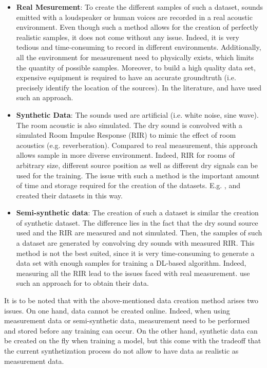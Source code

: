 \documentclass[11pt,a4paper,twoside]{report}
\begin{document}
\begin{itemize}
    \item \textbf{Real Mesurement}: To create the different samples of such a dataset, sounds emitted with a loudspeaker or human voices are recorded in a real acoustic environment. Even though such a method allows for the creation of perfectly realistic samples, it does not come without any issue. Indeed, it is very tedious and time-consuming to record in different environments. Additionally, all the environment for measurement need to physically exists, which limits the quantity of possible samples. Moreover, to build a high quality data set, expensive equipment is required to have an accurate groundtruth (i.e. precisely identify the location of the sources). In the literature, \cite{he2018deep} and \cite{ferguson2018sound} have used such an approach.
    \item \textbf{Synthetic Data}: The sounds used are artificial (i.e. white noise, sine wave). The room acoustic is also simulated. The dry sound is convolved with a simulated Room Impulse Response (RIR) to mimic the effect of room acoustics (e.g. reverberation). Compared to real measurement, this approach allows sample in more diverse environment. Indeed, RIR for rooms of arbitrary size, different source position as well as different dry signals can be used for the training. The issue with such a method is the important amount of time and storage required for the creation of the datasets. E.g. \cite{chakrabarty2017broadband}, \cite{perotin2018crnn} and \cite{adavanne2018direction} created their datasets in this way.
    \item \textbf{Semi-synthetic data}: The creation of such a dataset is similar the creation of synthetic dataset. The difference lies in the fact that the dry sound source used and the RIR are measured and not simulated. Then, the samples of such a dataset are generated by convolving dry sounds with measured RIR. This method is not the best suited, since it is very time-consuming to generate a data set with enough samples for training a DL-based algorithm. Indeed, measuring all the RIR lead to the issues faced with real measurement. \cite{takeda2016sound} use such an approach for to obtain their data.
\end{itemize}

It is to be noted that with the above-mentioned data creation method arises two issues. On one hand, data cannot be created online. Indeed, when using measurement data or semi-synthetic data, measurement need to be performed and stored before any training can occur. On the other hand, synthetic data can be created on the fly when training a model, but this come with the tradeoff that the current synthetization process do not allow to have data as realistic as measurement data.
\end{document}
